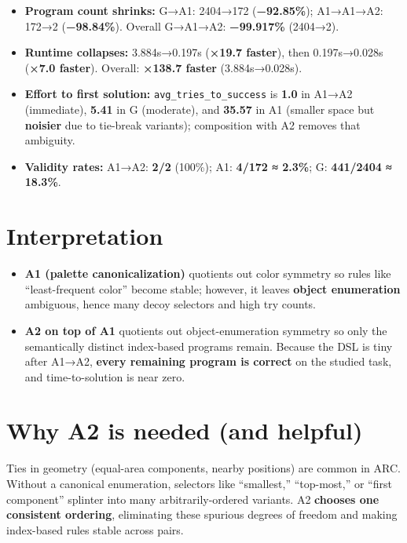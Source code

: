 \documentclass[11pt]{article}
\newcommand{\code}[1]{\texttt{#1}}
\begin{document}
\begin{itemize}
\item \textbf{Program count shrinks:} G→A1: 2404→172 (\textbf{−92.85\%}); A1→A1→A2: 172→2 (\textbf{−98.84\%}). Overall G→A1→A2: \textbf{−99.917\%} (2404→2).
\item \textbf{Runtime collapses:} 3.884s→0.197s (\textbf{×19.7 faster}), then 0.197s→0.028s (\textbf{×7.0 faster}). Overall: \textbf{×138.7 faster} (3.884s→0.028s).
\item \textbf{Effort to first solution:} \code{avg\_tries\_to\_success} is \textbf{1.0} in A1→A2 (immediate), \textbf{5.41} in G (moderate), and \textbf{35.57} in A1 (smaller space but \textbf{noisier} due to tie-break variants); composition with A2 removes that ambiguity.
\item \textbf{Validity rates:} A1→A2: \textbf{2/2} (100\%); A1: \textbf{4/172 ≈ 2.3\%}; G: \textbf{441/2404 ≈ 18.3\%}.
\end{itemize}

\section{Interpretation}

\begin{itemize}
\item \textbf{A1 (palette canonicalization)} quotients out color symmetry so rules like ``least-frequent color'' become stable; however, it leaves \textbf{object enumeration} ambiguous, hence many decoy selectors and high try counts.
\item \textbf{A2 on top of A1} quotients out object-enumeration symmetry so only the semantically distinct index-based programs remain. Because the DSL is tiny after A1→A2, \textbf{every remaining program is correct} on the studied task, and time-to-solution is near zero.
\end{itemize}

\section{Why A2 is needed (and helpful)}

Ties in geometry (equal-area components, nearby positions) are common in ARC. Without a canonical enumeration, selectors like ``smallest,'' ``top-most,'' or ``first component'' splinter into many arbitrarily-ordered variants. A2 \textbf{chooses one consistent ordering}, eliminating these spurious degrees of freedom and making index-based rules stable across pairs.
\end{document}
